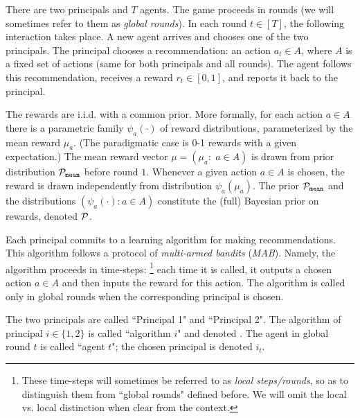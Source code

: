 

 There are two principals and $T$ agents. The game proceeds in rounds (we will sometimes refer to them as \emph{global rounds}). In each round $t\in [T]$, the following  interaction takes place. A new agent arrives and chooses one of the two principals. The principal chooses a recommendation: an action $a_t\in A$, where $A$ is a fixed set of actions (same for both principals and all rounds). The agent follows this recommendation, receives a reward $r_t\in [0,1]$, and reports it back to the principal.

The rewards are i.i.d. with a common prior. More formally, for each action $a\in A$ there is a parametric family $\psi_a(\cdot)$ of
reward distributions, parameterized by the mean reward $\mu_a$. (The paradigmatic case is 0-1 rewards with a given expectation.) The
mean reward vector $\mu = (\mu_a:\; a\in A)$ is drawn from prior distribution $\mathcal{P}_\mathtt{mean}$ before round $1$. Whenever a given action $a\in A$ is chosen, the reward is drawn independently from distribution $\psi_a(\mu_a)$. The prior $\mathcal{P}_\mathtt{mean}$ and the distributions $(\psi_a(\cdot)\colon a\in A)$ constitute the (full) Bayesian prior on rewards, denoted $\mathcal{P}$.

Each principal commits to a learning algorithm for making recommendations. This algorithm follows a protocol of \emph{multi-armed bandits} (\emph{MAB}). Namely, the algorithm proceeds in time-steps:%
\footnote{These time-steps will sometimes be referred to as \emph{local steps/rounds}, so as to distinguish them from ``global rounds" defined before. We will omit the local vs. local distinction when clear from the context.} each time it is called, it outputs a chosen action $a\in A$ and then inputs the reward for this action. The algorithm is called only in global rounds when the corresponding principal is chosen.

 The two principals are called ``Principal
1" and ``Principal 2".
The algorithm of principal $i\in \{1,2\}$ is called ``algorithm $i$" and denoted
\alg[i]. The agent in global round $t$ is called ``agent $t$"; the
chosen principal is denoted $i_t$.

